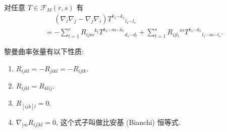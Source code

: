 \begin{theorem}
	对任意 $T\in\mathcal{F}_M(r,s)$ 有
	\begin{align*}
		&\phantom{{}={}}(\nabla_i\nabla_j-\nabla_j\nabla_i)T^{k_1\cdots k_r}{}_{l_1\cdots l_s} \\
		&=-\sum_{t=1}^{r}R_{ijm}{}^{k_t}T^{k_1\cdots m\cdots k_r}{}_{d_1\cdots d_l}+\sum_{t=1}^{s}R_{ijl_t}{}^{m}T^{k_1\cdots k_r}{}_{l_1\cdots m\cdots l_s}.
	\end{align*}
\end{theorem}
\begin{theorem}
\label{prop of R}
	黎曼曲率张量有以下性质:
	\begin{enumerate}
		\item $R_{ijkl}=-R_{jikl}=-R_{ijlk}$.
		\item $R_{ijkl}=R_{klij}$.
		\item $R_{[ijk]l}=0$.
		\item $\nabla_{[m}R_{ij]kl}=0$, 这个式子叫做比安基 (Bianchi) 恒等式.
	\end{enumerate}
\end{theorem}



